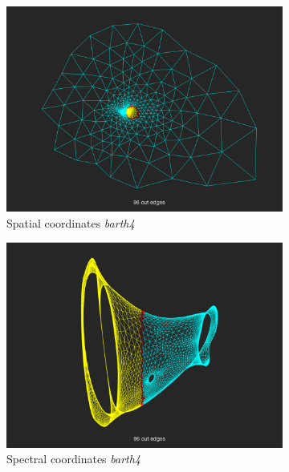 \documentclass[unicode,11pt,a4paper,oneside,numbers=endperiod,openany]{scrartcl}
\begin{document}
\begin{enumerate}
\begin{figure}[h!]
\begin{subfigure}[b]{0.45\textwidth}
		\includegraphics[width=\textwidth]{images/barth4_normal.png}
		\caption{Spatial coordinates \textit{barth4}}
		\end{subfigure}
		\hfill
		\begin{subfigure}[b]{0.45\textwidth}
		\includegraphics[width=\textwidth]{images/barth4_strange.png}
		\caption{Spectral coordinates \textit{barth4}}
		\end{subfigure}
		\vfill
		\begin{subfigure}[b]{0.45\textwidth}

\end{subfigure}
\end{figure}
\end{enumerate}
\end{document}
